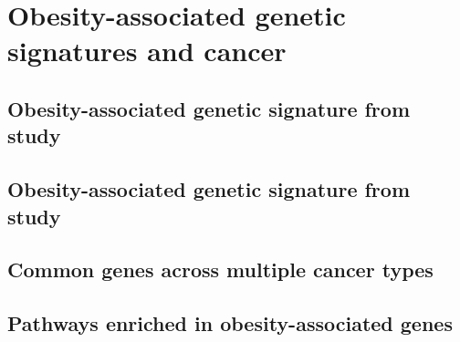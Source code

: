 \chapter{Obesity-associated genetic signatures and cancer}
\label{cha:obesity_genetic_signatures_and_cancer}

\section{Obesity-associated genetic signature from \citet{Creighton2012} study}
\label{sec:creighton_obesity_metagene}




\section{Obesity-associated genetic signature from \citet{Fuentes-Mattei2014} study}
\label{sec:fm_obesity_metagene}




\section{Common genes across multiple cancer types}
\label{sec:common_genes_across_multiple_cancer_types}




\section{Pathways enriched in obesity-associated genes}
\label{sec:pathways_enriched_in_obesity_associated_genes}






